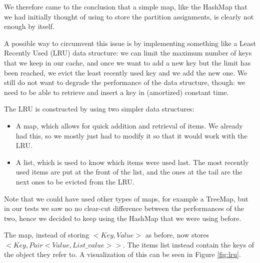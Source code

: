 We therefore came to the conclusion that a simple map, like the HashMap that we had initially thought of using to store the partition assignments, is clearly not enough by itself.

A possible way to circumvent this issue is by implementing something like a Least Recently Used (LRU) data structure: we can limit the maximum number of keys that we keep in our cache, and once we want to add a new key but the limit has been reached, we evict the least recently used key and we add the new one. We still do not want to degrade the performance of the data structure, though: we need to be able to retrieve and insert a key in (amortized) constant time.


The LRU is constructed by using two simpler data structures:
\begin{itemize}  
  \item A map, which allows for quick addition and retrieval of items. We already had this, so we mostly just had to modify it so that it would work with the LRU.
  \item A list, which is used to know which items were used last. The most recently used items are put at the front of the list, and the ones at the tail are the next ones to be evicted from the LRU.
\end{itemize}

Note that we could have used other types of maps, for example a TreeMap, but in our tests we saw no no clear-cut difference between the performances of the two, hence we decided to keep using the HashMap that we were using before.

The map, instead of storing $<Key, Value>$ as before, now stores $<Key, Pair<Value, List\_value>>$. The items list instead contain the keys of the object they refer to. A visualization of this can be seen in Figure \ref{fig:lru}.

